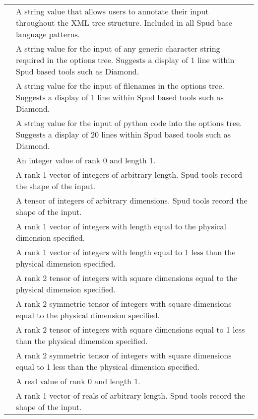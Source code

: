 \documentclass[a4paper, 11pt]{book}
\begin{document}
\noindent\begin{tabular}{lp{8cm}}
\lstinline *comment* & A string value that allows users to annotate their input throughout the XML tree structure.  Included in all Spud base language patterns. \\
\lstinline *anystring* & A string value for the input of any generic character string required in the options tree.  Suggests a display of 1 line within Spud based tools such as Diamond. \\
\lstinline *filename* & A string value for the input of filenames in the options tree.  Suggests a display of 1 line within Spud based tools such as Diamond. \\
\lstinline *python_code* & A string value for the input of python code into the options tree.  Suggests a display of 20 lines within Spud based tools such as Diamond. \\
\lstinline *integer* & An integer value of rank 0 and length 1. \\
\lstinline *integer_vector* & A rank 1 vector of integers of arbitrary length.  Spud tools record the shape of the input. \\
\lstinline *integer_tensor* & A tensor of integers of arbitrary dimensions.  Spud tools record the shape of the input. \\
\lstinline *integer_dim_vector* & A rank 1 vector of integers with length equal to the physical dimension specified. \\
\lstinline *integer_dim_minus_one_vector* & A rank 1 vector of integers with length equal to 1 less than the physical dimension specified. \\
\lstinline *integer_dim_tensor* & A rank 2 tensor of integers with square dimensions equal to the physical dimension specified. \\
\lstinline *integer_dim_symmetric_tensor* & A rank 2 symmetric tensor of integers with square dimensions equal to the physical dimension specified. \\
\lstinline *integer_dim_minus_one_tensor* & A rank 2 tensor of integers with square dimensions equal to 1 less than the physical dimension specified. \\
\lstinline *integer_dim_minus_one_symmetric_tensor* & A rank 2 symmetric tensor of integers with square dimensions equal to 1 less than the physical dimension specified. \\
\lstinline *real* & A real value of rank 0 and length 1. \\
\lstinline *real_vector* & A rank 1 vector of reals of arbitrary length.  Spud tools record the shape of the input. \\

\end{tabular}
\end{document}

